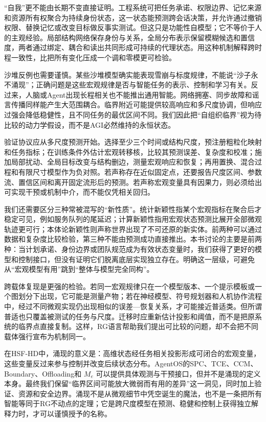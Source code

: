 “自我”更不能由长期不变直接证明。工程系统可把任务承诺、权限边界、记忆来源和资源所有权聚合为持续身份状态，这一状态能预测跨会话决策，并允许通过撤销权限、替换记忆或改变目标做反事实测试。但这只是功能性自模型；它不等价于人的主观经验。局部结构网络保存身份与关系，全局分布表示保留模糊候选和置信度，两者通过绑定、耦合和读出共同形成可持续的代理状态。用这种机制解释跨时程一致性，比把所有变化压成一个调和零模更可检验。

沙堆反例也需要谨慎。某些沙堆模型确实能表现雪崩与标度规律，不能说“沙子永不涌现”；正确问题是这些宏观规律是否与智能任务的表示、控制和学习有关。反过来，人脑或Agent出现长程相关也不能推出通用智能。网络拥塞、同步故障和谣言传播同样能产生大范围耦合。临界附近可能提供较高响应和多尺度协调，但响应过强会降低稳健性，且不同任务的最优区间不同。我们因此把“自组织临界”视为待比较的动力学假设，而不是AGI必然维持的永恒状态。

验证协议应从多尺度预测开始。选择至少三个时间或结构尺度，预注册粗粒化映射和任务指标；在训练条件外估计宏观转移核，比较其预测误差、复杂度和校准；施加局部扰动、全局目标改变与结构删边，测量宏观响应和恢复；再用置换、混合过程和有限尺寸模型作为负对照。若声称存在近似固定点，还要报告尺度区间、参数流、置信区间和离开固定流形后的预测。若声称宏观变量具有因果力，则必须给出可实现干预或机制中介，而不能仅凭相关回归。

我们还需要区分三种常被混写的“新性质”。统计新颖性指某个宏观指标在聚合后才稳定可见，例如服务队列的尾延迟；计算新颖性指用宏观状态预测比展开全部微观轨迹更可行；本体论新颖性则声称世界出现了不可还原的新实体。前两种可以通过数据和复杂度比较检验，第三种不能由预测成功直接推出。本书讨论的主要是前两种：当计划承诺、身份边界或团队规范成为有效状态变量时，我们获得了更好的模型和控制接口，但没有证明它们脱离底层实现独立存在。明确这一层级，可避免从“宏观模型有用”跳到“整体与模型完全同构”。

跨载体复现是更强的检验。若同一宏观规律只在一个模型版本、一个提示模板或一个图划分下出现，它可能是测量产物；若在神经模型、符号规划器和人机协作流程中，经过不同微观实现仍出现相似的误差—恢复关系，才可能接近普适类。但所谓普适也只覆盖被测试的任务与尺度。迁移时应重新估计投影和阈值，而不是把原系统的临界点直接复制。这样，RG语言帮助我们提出可比较的问题，却不会把不同载体强行宣布为机制同一。

在HSF-HD中，涌现的意义是：高维状态经任务相关投影形成可闭合的宏观变量，这些变量反过来参与控制并改变后续状态分布。AgentOS的SPC、TCE、CCM、Boundary、Offloading和 $M_e$ 可以提供具体观测与干预接口，但并不是涌现的定义本身。最终我们保留“临界区间可能放大微弱而有用的差异”这一洞见，同时加上验证、资源和安全边界。涌现不是从微观细节中凭空诞生的魔法，也不是一条把所有智能等同于RG不动点的定理；它是跨尺度模型在预测、稳健和控制上获得独立解释力时，才可以谨慎授予的名称。

